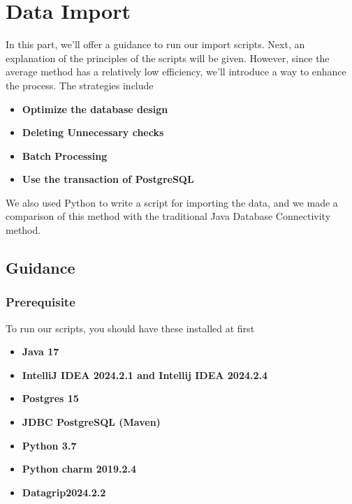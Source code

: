 \documentclass{article}
\begin{document}
\section{Data Import}
In this part, we’ll offer a guidance to run our import scripts. Next, an explanation of the principles of the scripts will be given. However, since the average method has a relatively low efficiency, we’ll introduce a way to enhance the
process. The strategies include
\begin{itemize}
    \item\textbf{ Optimize the database design}
    \item\textbf{ Deleting Unnecessary checks}
    \item\textbf{ Batch Processing}
    \item\textbf{ Use the transaction of PostgreSQL}
\end{itemize}
We also used Python to write a script for importing the data, and we made a comparison of this method with the traditional Java Database Connectivity method.
\subsection{Guidance}
\subsubsection{Prerequisite}
To run our scripts, you should have these installed at first
\begin{itemize}
    \item\textbf{ Java 17}
    \item\textbf{ IntelliJ IDEA 2024.2.1 and Intellij IDEA 2024.2.4}
    \item\textbf{ Postgres 15}
    \item\textbf{ JDBC PostgreSQL (Maven)}
    \item\textbf{ Python 3.7}
    \item\textbf{ Python charm 2019.2.4}
    \item\textbf{ Datagrip2024.2.2}
\end{itemize}
\end{document}
